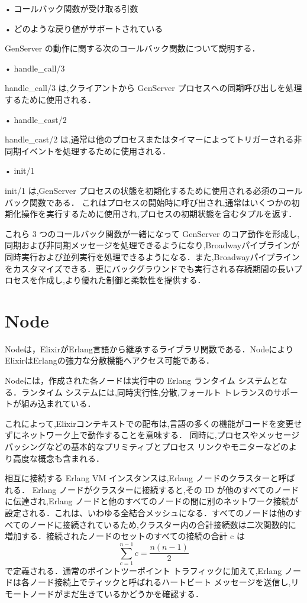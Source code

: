 \documentclass[a4paper]{jreport}	%
\begin{document}
• コールバック関数が受け取る引数

• どのような戻り値がサポートされている

GenServer の動作に関する次のコールバック関数について説明する．

• handle\_call/3

handle\_call/3 は,クライアントから GenServer プロセスへの同期呼び出しを処理するために使用される．

• handle\_cast/2

handle\_cast/2 は,通常は他のプロセスまたはタイマーによってトリガーされる非同期イベントを処理するために使用される．

• init/1

init/1 は,GenServer プロセスの状態を初期化するために使用される必須のコールバック関数である． これはプロセスの開始時に呼び出され,通常はいくつかの初期化操作を実行するために使用され,プロセスの初期状態を含むタプルを返す．


これら 3 つのコールバック関数が一緒になって GenServer のコア動作を形成し,同期および非同期メッセージを処理できるようになり,Broadwayパイプラインが同時実行および並列実行を処理できるようになる．また,Broadwayパイプラインをカスタマイズできる．更にバックグラウンドでも実行される存続期間の長いプロセスを作成し,より優れた制御と柔軟性を提供する．


\section{Node}
Nodeは，ElixirがErlang言語から継承するライブラリ関数である\cite{H}．NodeによりElixirはErlangの強力な分散機能へアクセス可能である\cite{J}．

Nodeには，作成された各ノードは実行中の Erlang ランタイム システムとなる．ランタイム システムには,同時実行性,分散,フォールト トレランスのサポートが組み込まれている．

これによって,Elixirコンテキストでの配布は,言語の多くの機能がコードを変更せずにネットワーク上で動作することを意味する． 同時に,プロセスやメッセージ パッシングなどの基本的なプリミティブとプロセス リンクやモニターなどのより高度な概念も含まれる．

相互に接続する Erlang VM インスタンスは,Erlang ノードのクラスターと呼ばれる． Erlang ノードがクラスターに接続すると,その ID が他のすべてのノードに伝達され,Erlang ノードと他のすべてのノードの間に別のネットワーク接続が設定される．これは、いわゆる全結合メッシュになる．すべてのノードは他のすべてのノードに接続されているため,クラスター内の合計接続数は二次関数的に増加する．接続されたノードのセットのすべての接続の合計 c は \[ \sum_{c=1}^{n-1}c = \frac{n(n-1)}2\]で定義される．通常のポイントツーポイント トラフィックに加えて,Erlang ノードは各ノード接続上でティックと呼ばれるハートビート メッセージを送信し,リモートノードがまだ生きているかどうかを確認する．
\end{document}
